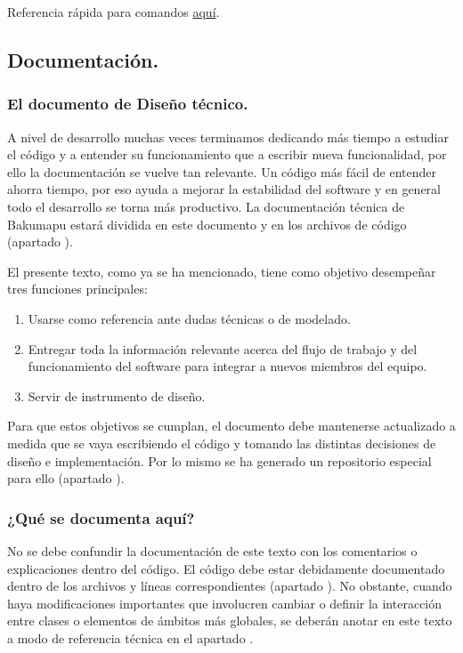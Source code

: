 Referencia rápida para comandos  \href{https://rogerdudler.github.io/git-guide}{aquí}.


\subsection{Documentación.}\label{flujo:documentacion}

\subsubsection{El documento de Diseño técnico.}\label{flujo:documento-de-diseno}
A nivel de desarrollo muchas veces terminamos dedicando más tiempo a estudiar el código y a entender su funcionamiento que a escribir nueva funcionalidad, por ello la documentación se vuelve tan relevante. Un código más fácil de entender ahorra tiempo, por eso ayuda a mejorar la estabilidad del software y en general todo el desarrollo se torna más productivo. La documentación técnica de Bakumapu estará dividida en este documento y en los archivos de código (apartado ).

El presente texto, como ya se ha mencionado, tiene como objetivo desempeñar tres funciones principales:
\begin{enumerate}[noitemsep]
	\item Usarse como referencia ante dudas técnicas o de modelado.
	\item Entregar toda la información relevante acerca del flujo de trabajo y del funcionamiento del software para integrar a nuevos miembros del equipo.
	\item Servir de instrumento de diseño.
\end{enumerate}

Para que estos objetivos se cumplan, el documento debe mantenerse actualizado a medida que se vaya escribiendo el código y tomando las distintas decisiones de diseño e implementación. Por lo mismo se ha generado un repositorio especial para ello (apartado ). 

\subsubsection*{¿Qué se documenta aquí?}
No se debe confundir la documentación de este texto con los comentarios o explicaciones dentro del código. El código debe estar debidamente documentado dentro de los archivos y líneas correspondientes (apartado ). No obstante, cuando haya modificaciones importantes que involucren cambiar o definir la interacción entre clases o elementos de ámbitos más globales, se deberán anotar en este texto a modo de referencia técnica en el apartado .

